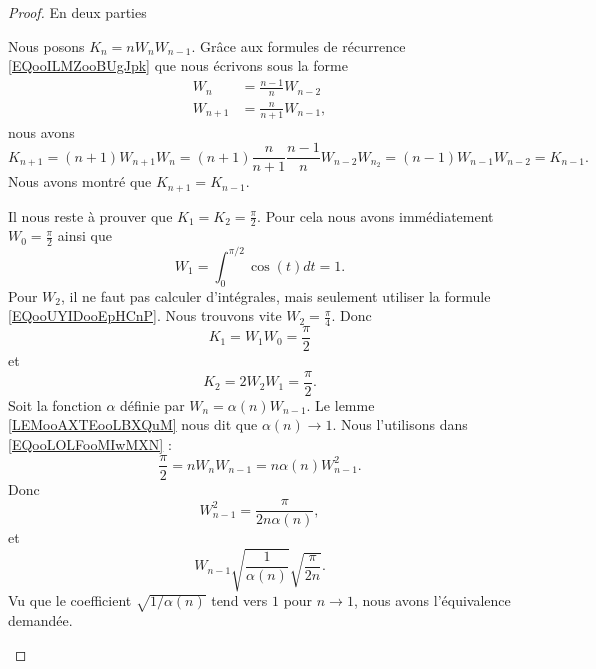 \begin{proof}
	En deux parties
	\begin{subproof}
		Nous posons \( K_n=nW_nW_{n-1}\). Grâce aux formules de récurrence \eqref{EQooILMZooBUgJpk} que nous écrivons sous la forme
		\begin{subequations}
			\begin{align}
				W_n     & =\frac{ n-1 }{ n }W_{n-2}  \\
				W_{n+1} & =\frac{ n }{ n+1 }W_{n-1},
			\end{align}
		\end{subequations}
		nous avons
		\begin{equation}
			K_{n+1}=(n+1)W_{n+1}W_n=(n+1)\frac{ n }{ n+1 }\frac{ n-1 }{ n }W_{n-2}W_{n_2}=(n-1)W_{n-1}W_{n-2}=K_{n-1}.
		\end{equation}
		Nous avons montré que \( K_{n+1}=K_{n-1}\).

		Il nous reste à prouver que \( K_1=K_2=\frac{ \pi }{2}\). Pour cela nous avons immédiatement \( W_0=\frac{ \pi }{2}\) ainsi que
		\begin{equation}
			W_1=\int_0^{\pi/2}\cos(t)dt=1.
		\end{equation}
		Pour \( W_2\), il ne faut pas calculer d'intégrales, mais seulement utiliser la formule \eqref{EQooUYIDooEpHCnP}. Nous trouvons vite \( W_2=\frac{ \pi }{ 4 }\). Donc
		\begin{equation}
			K_1=W_1W_0=\frac{ \pi }{2}
		\end{equation}
		et
		\begin{equation}
			K_2=2W_2W_1=\frac{ \pi }{2}.
		\end{equation}
		Soit la fonction \( \alpha\)  définie par \( W_n=\alpha(n)W_{n-1}\). Le lemme \ref{LEMooAXTEooLBXQuM} nous dit que \( \alpha(n)\to 1\). Nous l'utilisons dans \eqref{EQooLOLFooMIwMXN} :
		\begin{equation}
			\frac{ \pi }{2}=nW_nW_{n-1}=n\alpha(n)W_{n-1}^2.
		\end{equation}
		Donc
		\begin{equation}
			W_{n-1}^2=\frac{ \pi }{ 2n\alpha(n) },
		\end{equation}
		et
		\begin{equation}
			W_{n-1}\sqrt{ \frac{1}{ \alpha(n) } }\sqrt{ \frac{ \pi }{ 2n } }.
		\end{equation}
		Vu que le coefficient \( \sqrt{ 1/\alpha(n) }\) tend vers \( 1\) pour \( n\to 1\), nous avons l'équivalence demandée.
	\end{subproof}
\end{proof}

